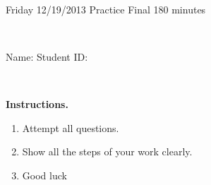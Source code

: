 \documentclass[12pt, oneside]{amsart}
\begin{document}
%

\begin{center}
    \hrulefill\\
    {\bf \textsf{\raisebox{-0.10cm}{Fall 2013: MATH 163} \hspace{\fill} 
            \raisebox{-0.10cm}{Ordinary Differential Equations} \hspace{\fill}
            \raisebox{-0.10cm}{David Karapetyan}}}\\
    \hrulefill\\
    {\large \rule{0cm}{1.2cm} \textsf{Friday 12/19/2013} \hfill
        \textsf{Practice Final} \hfill  \textsf{180 minutes}}\\
    {\large\rule{0cm}{1.2cm}\textsf{Name: \framebox[2.9in]{\rule{0cm}{0.8cm}} 
            \hspace{\fill}
            Student ID: \framebox[2.1in]{\rule{0cm}{0.8cm}}}}\\
\end{center}
\vspace{0.8cm}

\noindent
{\bf \textsf{Instructions.}}

\begin{enumerate}
    \item Attempt all questions.   
    \item Show all the steps of your work clearly.  
    \item Good luck 
\end{enumerate}

\vfill

\end{document}
